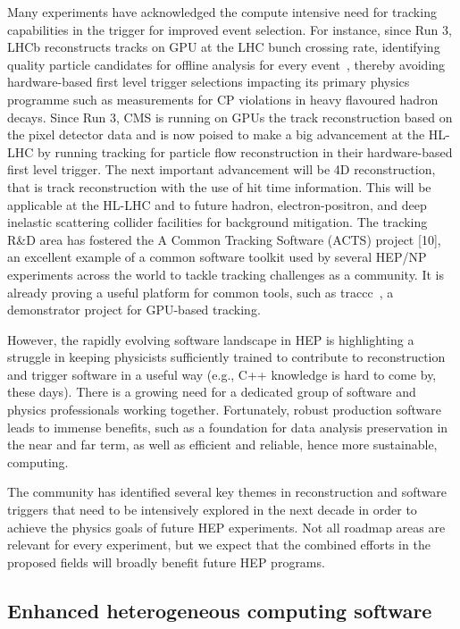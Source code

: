 \documentclass[10pt,a4paper]{article}
\begin{document}
Many experiments have acknowledged the compute intensive need for
tracking capabilities in the trigger for improved event selection. For
instance, since Run 3, LHCb reconstructs tracks on GPU at the LHC bunch
crossing rate, identifying quality particle candidates for offline
analysis for every event~\cite{LHCb:HLT},
thereby avoiding hardware-based first level trigger selections impacting
its primary physics programme such as measurements for CP violations in
heavy flavoured hadron decays. Since Run 3, CMS is running on GPUs the
track reconstruction based on the pixel detector data and is now poised
to make a big advancement at the HL-LHC by running tracking for particle
flow reconstruction in their hardware-based first level trigger. The
next important advancement will be 4D reconstruction, that is track
reconstruction with the use of hit time information. This will be
applicable at the HL-LHC and to future hadron, electron-positron, and
deep inelastic scattering collider facilities for background mitigation.
The tracking R\&D area has fostered the A Common Tracking Software
(ACTS) project {[}10{]}, an excellent example of a common software
toolkit used by several HEP/NP experiments across the world to tackle
tracking challenges as a community. It is already proving a useful
platform for common tools, such as
traccc~\cite{traccc}, a demonstrator
project for GPU-based tracking.

However, the rapidly evolving software landscape in HEP is highlighting
a struggle in keeping physicists sufficiently trained to contribute to
reconstruction and trigger software in a useful way (e.g., C++ knowledge
is hard to come by, these days). There is a growing need for a dedicated
group of software and physics professionals working together.
Fortunately, robust production software leads to immense benefits, such
as a foundation for data analysis preservation in the near and far term,
as well as efficient and reliable, hence more sustainable, computing.

The community has identified several key themes in reconstruction and
software triggers that need to be intensively explored in the next
decade in order to achieve the physics goals of future HEP experiments.
Not all roadmap areas are relevant for every experiment, but we expect
that the combined efforts in the proposed fields will broadly benefit
future HEP programs.

\subsection{Enhanced heterogeneous computing
software}\label{enhanced-heterogeneous-computing-software}
\end{document}
